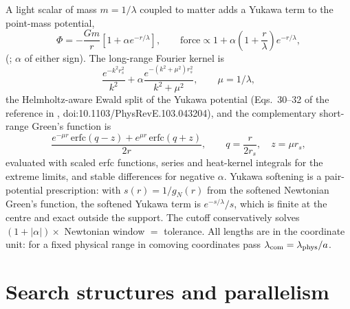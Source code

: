 A light scalar of mass $m=1/\lambda$ coupled to matter adds a Yukawa term to the point-mass potential,
\begin{equation}
\Phi=-\frac{Gm}{r}\left[1+\alpha e^{-r/\lambda}\right],\qquad
\text{force}\propto1+\alpha\left(1+\frac r\lambda\right)e^{-r/\lambda},
\end{equation}
(; $\alpha$ of either sign). The long-range Fourier kernel is
\begin{equation}
\frac{e^{-k^2r_s^2}}{k^2}+\alpha\frac{e^{-(k^2+\mu^2)r_s^2}}{k^2+\mu^2},\qquad \mu=1/\lambda,
\end{equation}
the Helmholtz-aware Ewald split of the Yukawa potential (Eqs.~30--32 of the reference in ,
doi:10.1103/PhysRevE.103.043204), and the complementary short-range Green's function is
\begin{equation}
\frac{e^{-\mu r}\,\mathrm{erfc}(q-z)+e^{\mu r}\,\mathrm{erfc}(q+z)}{2r},\qquad q=\frac{r}{2r_s},\quad z=\mu r_s,
\end{equation}
evaluated with scaled erfc functions, series and heat-kernel integrals for the extreme limits, and stable differences
for negative $\alpha$. Yukawa softening is a pair-potential prescription: with $s(r)=1/g_N(r)$ from the softened
Newtonian Green's function, the softened Yukawa term is $e^{-s/\lambda}/s$, which is finite at the centre and exact
outside the support. The cutoff conservatively solves $(1+|\alpha|)\times$ Newtonian window $=$ tolerance. All lengths
are in the coordinate unit: for a fixed physical range in comoving coordinates pass $\lambda_{\rm com}=\lambda_{\rm phys}/a$.

\section{Search structures and parallelism}\label{sec:sr-search}


